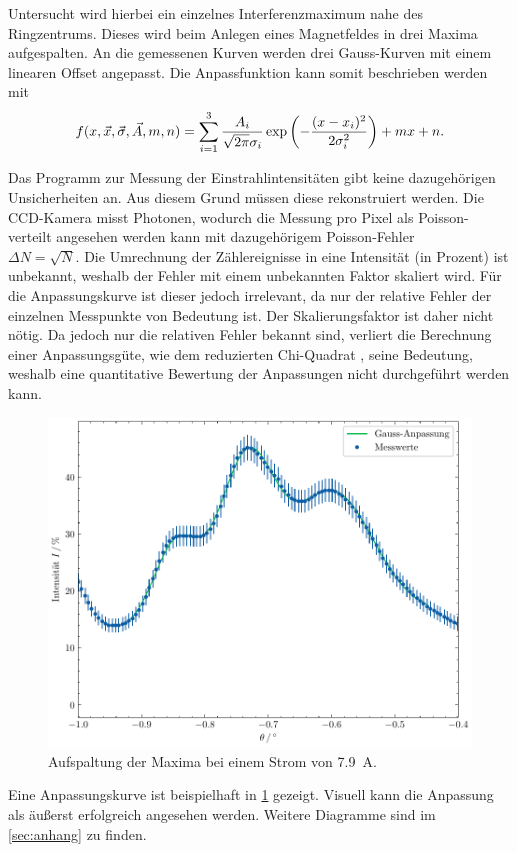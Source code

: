 Untersucht wird hierbei ein einzelnes Interferenzmaximum nahe des Ringzentrums. Dieses wird 
beim Anlegen eines Magnetfeldes in drei Maxima aufgespalten. An die gemessenen Kurven 
werden drei Gauss-Kurven mit einem linearen Offset angepasst. Die Anpassfunktion kann somit beschrieben werden 
mit 
\begin{equation*}
    f(x, \vec x, \vec \sigma, \vec A, m, n) = \sum_{i=1}^3 \frac{A_i}{\sqrt{2\pi}\sigma_i}
        \exp\qty(-\frac{(x-x_i)^2}{2\sigma_i^2}) +mx + n.
\end{equation*}

Das Programm zur Messung der Einstrahlintensitäten gibt keine dazugehörigen Unsicherheiten an.
Aus diesem Grund müssen diese rekonstruiert werden. Die CCD-Kamera misst Photonen, wodurch 
die Messung pro Pixel als Poisson-verteilt angesehen werden kann mit dazugehörigem Poisson-Fehler \\
$\Delta N = \sqrt{N}$. Die Umrechnung der Zählereignisse in eine Intensität (in Prozent) ist unbekannt, 
weshalb der Fehler mit einem unbekannten Faktor skaliert wird. Für die Anpassungskurve 
ist dieser jedoch irrelevant, da nur der relative Fehler der einzelnen Messpunkte von Bedeutung ist. 
Der Skalierungsfaktor ist daher nicht nötig. Da jedoch nur die relativen Fehler bekannt sind, verliert 
die Berechnung einer Anpassungsgüte, wie dem reduzierten Chi-Quadrat \cite{wiki:reduced_chi_square},
seine Bedeutung, weshalb eine quantitative Bewertung der Anpassungen nicht durchgeführt werden kann.

\begin{figure}
    \centering
    \includegraphics[width=.6\linewidth]{../figs/gauss_i7.9.pdf}
    \caption{Aufspaltung der Maxima bei einem Strom von \SI{7.9}{\ampere}.}
    \label{fig:gauss_i79}
\end{figure}

Eine Anpassungskurve ist beispielhaft in \cref{fig:gauss_i79} gezeigt. Visuell
kann die Anpassung als äußerst erfolgreich angesehen werden. Weitere Diagramme 
sind im \cref{sec:anhang} zu finden.


